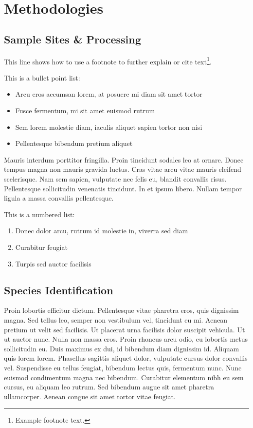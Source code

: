 \section{Methodologies}

\subsection{Sample Sites \& Processing}

This line shows how to use a footnote to further explain or cite text\footnote{Example footnote text.}.

This is a bullet point list:

\begin{itemize}
	\item Arcu eros accumsan lorem, at posuere mi diam sit amet tortor
	\item Fusce fermentum, mi sit amet euismod rutrum
	\item Sem lorem molestie diam, iaculis aliquet sapien tortor non nisi
	\item Pellentesque bibendum pretium aliquet
\end{itemize}

Mauris interdum porttitor fringilla. Proin tincidunt sodales leo at ornare. Donec tempus magna non mauris gravida luctus. Cras vitae arcu vitae mauris eleifend scelerisque. Nam sem sapien, vulputate nec felis eu, blandit convallis risus. Pellentesque sollicitudin venenatis tincidunt. In et ipsum libero. Nullam tempor ligula a massa convallis pellentesque.

This is a numbered list:

\begin{enumerate}
	\item Donec dolor arcu, rutrum id molestie in, viverra sed diam
	\item Curabitur feugiat
	\item Turpis sed auctor facilisis
\end{enumerate}

\subsection{Species Identification}

Proin lobortis efficitur dictum. Pellentesque vitae pharetra eros, quis dignissim magna. Sed tellus leo, semper non vestibulum vel, tincidunt eu mi. Aenean pretium ut velit sed facilisis. Ut placerat urna facilisis dolor suscipit vehicula. Ut ut auctor nunc. Nulla non massa eros. Proin rhoncus arcu odio, eu lobortis metus sollicitudin eu. Duis maximus ex dui, id bibendum diam dignissim id. Aliquam quis lorem lorem. Phasellus sagittis aliquet dolor, vulputate cursus dolor convallis vel. Suspendisse eu tellus feugiat, bibendum lectus quis, fermentum nunc. Nunc euismod condimentum magna nec bibendum. Curabitur elementum nibh eu sem cursus, eu aliquam leo rutrum. Sed bibendum augue sit amet pharetra ullamcorper. Aenean congue sit amet tortor vitae feugiat.

